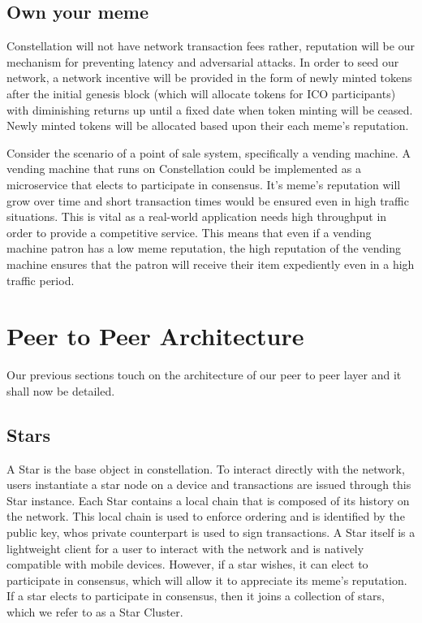 \documentclass{article}
\begin{document}
 \subsection{Own your meme}
Constellation will not have network transaction fees rather, reputation will be our mechanism for preventing latency and adversarial attacks. In order to seed our network, a network incentive will be provided in the form of newly minted tokens after the initial genesis block (which will allocate tokens for ICO participants) with diminishing returns up until a fixed date when token minting will be ceased. Newly minted tokens will be allocated based upon their each meme's reputation.

Consider the scenario of a point of sale system, specifically a vending machine. A vending machine that runs on Constellation could be implemented as a microservice that elects to participate in consensus. It's meme's reputation will grow over time and short transaction times would be ensured even in high traffic situations. This is vital as a real-world application needs high throughput in order to provide a competitive service. This means that even if a vending machine patron has a low meme reputation, the high reputation of the vending machine ensures that the patron will receive their item expediently even in a high traffic period. 

\section{Peer to Peer Architecture}
Our previous sections touch on the architecture of our peer to peer layer and it shall now be detailed. 

\subsection{Stars}
A Star is the base object in constellation. To interact directly with the network, users instantiate a star node on a device and transactions are issued through this Star instance. Each Star contains a local chain that is composed of its history on the network. This local chain is used to enforce ordering and is identified by the public key, whos private counterpart is used to sign transactions. A Star itself is a lightweight client for a user to interact with the network and is natively compatible with mobile devices. However, if a star wishes, it can elect to participate in consensus, which will allow it to appreciate its meme's reputation. If a star elects to participate in consensus, then it joins a collection of stars, which we refer to as a Star Cluster.
\end{document}
